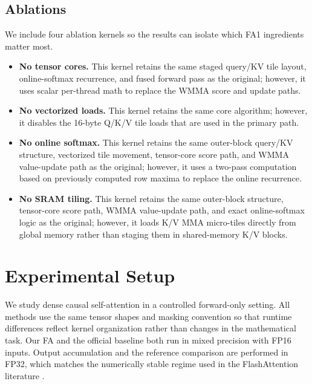 \documentclass{article}
\begin{document}
\subsection{Ablations}
We include four ablation kernels so the results can isolate which FA1 ingredients matter most.
\begin{itemize}
    \item \textbf{No tensor cores.} This kernel retains the same staged query/KV tile layout, online-softmax recurrence, and fused forward pass as the original; however, it uses scalar per-thread math to replace the WMMA score and update paths.
    \item \textbf{No vectorized loads.} This kernel retains the same core algorithm; however, it disables the 16-byte Q/K/V tile loads that are used in the primary path.
    \item \textbf{No online softmax.} This kernel retains the same outer-block query/KV structure, vectorized tile movement, tensor-core score path, and WMMA value-update path as the original; however, it uses a two-pass computation based on previously computed row maxima to replace the online recurrence.
    \item \textbf{No SRAM tiling.} This kernel retains the same outer-block structure, tensor-core score path, WMMA value-update path, and exact online-softmax logic as the original; however, it loads K/V MMA micro-tiles directly from global memory rather than staging them in shared-memory K/V blocks.
\end{itemize}

\section{Experimental Setup}
We study dense causal self-attention in a controlled forward-only setting. All methods use the same tensor shapes and masking convention so that runtime differences reflect kernel organization rather than changes in the mathematical task. Our FA and the official baseline both run in mixed precision with FP16 inputs. Output accumulation and the reference comparison are performed in FP32, which matches the numerically stable regime used in the FlashAttention literature \citep{dao2022flashattention}.
\end{document}
